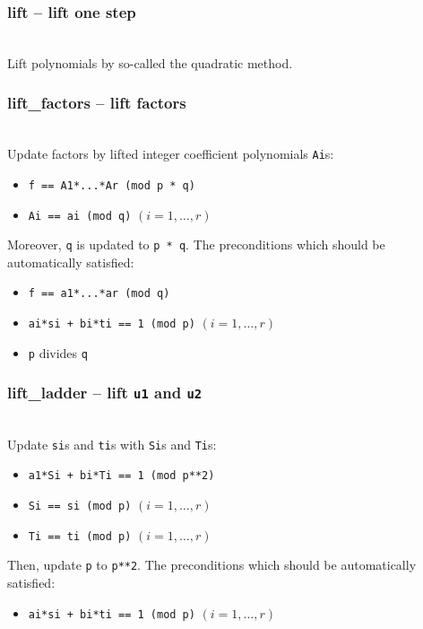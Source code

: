   \subsubsection{lift -- lift one step}
  \\
  \spacing
  \quad Lift polynomials by so-called the quadratic method.
  \subsubsection{lift\_factors -- lift factors}
  \\
  \spacing
  \quad Update factors by lifted integer coefficient polynomials {\tt Ai}s:
  \begin{itemize}
  \item {\tt f == A1*...*Ar (mod p * q)}
  \item {\tt Ai == ai (mod q)} \((i = 1, \ldots, r)\)
  \end{itemize}
  Moreover, {\tt q} is updated to {\tt p * q}.
  \spacing
  \quad \negok The preconditions which should be automatically satisfied:
  \begin{itemize}
  \item {\tt f == a1*...*ar (mod q)}
  \item {\tt ai*si + bi*ti == 1 (mod p)} \((i = 1,\ldots, r)\)
  \item {\tt p} divides {\tt q}
  \end{itemize}
  \subsubsection{lift\_ladder -- lift {\tt u1} and {\tt u2}}
  \\
  \spacing
  \quad Update {\tt si}s and {\tt ti}s with {\tt Si}s and {\tt Ti}s:
  \begin{itemize}
  \item {\tt a1*Si + bi*Ti == 1 (mod p**2)}
  \item {\tt Si == si (mod p)} \((i = 1, \ldots, r)\)
  \item {\tt Ti == ti (mod p)} \((i = 1, \ldots, r)\)
  \end{itemize}
  Then, update {\tt p} to {\tt p**2}.
  \spacing
  \quad \negok The preconditions which should be automatically satisfied:
  \begin{itemize}
  \item {\tt ai*si + bi*ti == 1 (mod p)} \((i = 1,\ldots, r)\)
  \end{itemize}
%

